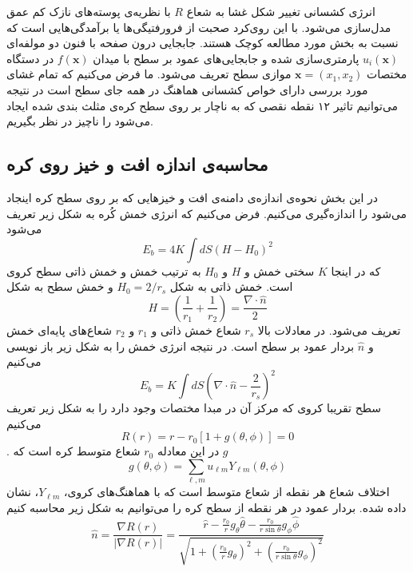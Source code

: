 انرژی کشسانی تغییر شکل غشا به شعاع
 $R$ 
با نظریه‌ی پوسته‌های نازک کم عمق مدل‌سازی می‌شود. با این روی‌کرد صحبت از فرورفتیگی‌ها یا برآمدگی‌هایی است که نسبت به بخش مورد مطالعه کوچک هستند. جابجایی درون صفحه با فنون دو مولفه‌ای 
$u_i(\boldsymbol{x})$ 
پارمتری‌سازی شده و جابجایی‌های عمود بر سطح با میدان 
$f(\boldsymbol{x})$
در دستگاه مختصات
$\boldsymbol{x}=(x_1,x_2)$
موازی سطح تعریف می‌‌شود. ما فرض می‌کنیم که تمام غشای مورد بررسی دارای خواص کشسانی هماهنگ در همه جای سطح است در نتیجه می‌توانیم تاثیر ۱۲ نقطه نقصی که به ناچار بر روی سطح کره‌ی مثلث بندی شده ایجاد می‌شود را ناچیز در نظر بگیریم.

\subsection{محاسبه‌ی اندازه افت و خیز روی کره}
در این بخش نحوه‌ی اندازه‌ی دامنه‌ی افت و خیزهایی که بر روی سطح کره اینجاد می‌شود را اندازه‌گیری می‌کنیم. 
\cite{safran1983}
فرض می‌کنیم که انرژی خمش کُره به شکل زیر تعریف می‌شود
\begin{equation}
E_{b}=4K\int dS\left(H-H_0\right)^2
\end{equation}
 که در اینجا 
 $K$
 سختی خمش و
 $H$
و 
$H_0$
به ترتیب خمش و خمش ذاتی سطح کروی است. خمش ذاتی به شکل 
$H_0=2/r_s$
و خمش سطح به شکل
\begin{equation}
H=\left(\frac{1}{r_1}+\frac{1}{r_2}\right)=\frac{\nabla\cdot\hat n}{2}
\end{equation}
تعریف می‌شود. در معادلات بالا 
$r_s$
شعاع خمش ذاتی و 
$r_1$ و $r_2$
شعاع‌های پایه‌ای خمش
و $\hat n$ بردار عمود بر سطح است. در نتیجه انرژی خمش را به شکل زیر باز نویسی می‌کنیم
\begin{equation}
E_{b}=K\int dS\left(\nabla\cdot\hat n-\frac{2}{r_s}\right)^2
\label{eq:ebforsubstitution}
\end{equation}
سطح تقریبا کروی که مرکز آن در مبدا مختصات وجود دارد را به شکل زیر تعریف می‌کنیم
\begin{equation}
R(r)= r-r_0\left[1+g(\theta,\phi)\right]=0
\label{eq:radiusdef}
\end{equation}
. در این معادله $r_0$ شعاع متوسط کره است که $g$
\begin{equation}
g(\theta,\phi)=\sum_{\ell,m}u_{\ell m}Y_{\ell m} (\theta,\phi)
\label{eq:gdef}
\end{equation}
اختلاف شعاع هر نقطه از شعاع متوسط است که با هماهنگ‌های کروی، $Y_{\ell m}$، نشان داده شده. بردار عمود در هر نقطه از سطح کره را می‌توانیم به شکل زیر محاسبه کنیم
\begin{equation}
\hat n = \frac{\nabla R(r)}{|\nabla R(r)|}= \frac{\hat r-\frac{r_0}{r}g_\theta \hat\theta-\frac{r_0}{r\sin\theta}g_\phi\hat\phi }{\sqrt{1+\left(\frac{r_0}{r}g_\theta\right)^2+\left(\frac{r_0}{r\sin\theta}g_\phi\right)^2 }}
\end{equation}
